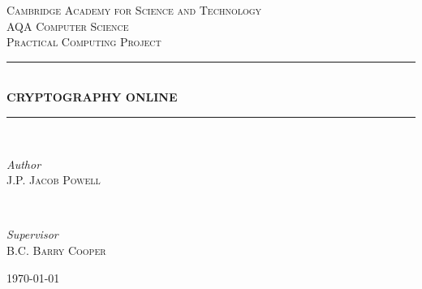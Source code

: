 %
%

\begin{titlepage}

\newcommand{\HRule}{\rule{\linewidth}{0.5mm}}

\center


\textsc{\LARGE Cambridge Academy for Science and Technology}\\[1.5cm]
\textsc{\Large AQA Computer Science}\\[0.5cm]
\textsc{\large Practical Computing Project}\\[0.5cm]


\HRule\\[0.4cm]

{\huge\bfseries \textsc{CRYPTOGRAPHY ONLINE}}\\[0.4cm]

\HRule\\[0.4cm]

\begin{minipage}{0.4\textwidth}
	\begin{flushleft}
		\large
		\textit{Author}\\
		J.P. \textsc{Jacob Powell}
	\end{flushleft}
\end{minipage}
~
\begin{minipage}{0.4\textwidth}
	\begin{flushright}
	\large
	\textit{Supervisor}\\
	B.C. \textsc{Barry Cooper}
	\end{flushright}
\end{minipage}

%
%

\vfill\vfill\vfill %
{\large\today}

%
%

\vfill

\end{titlepage}

